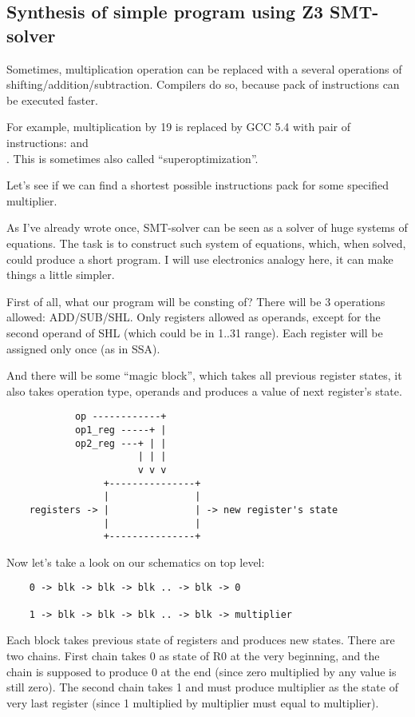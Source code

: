 \subsection{Synthesis of simple program using Z3 SMT-solver}

Sometimes, multiplication operation can be replaced with a several operations of shifting/addition/subtraction.
Compilers do so, because pack of instructions can be executed faster.

For example, multiplication by 19 is replaced by GCC 5.4 with pair of instructions:  and\\
.
This is sometimes also called ``superoptimization''.

Let's see if we can find a shortest possible instructions pack for some specified multiplier.

As I've already wrote once, SMT-solver can be seen as a solver of huge systems of equations.
The task is to construct such system of equations, which, when solved, could produce a short program.
I will use electronics analogy here, it can make things a little simpler.

First of all, what our program will be consting of? There will be 3 operations allowed: ADD/SUB/SHL.
Only registers allowed as operands, except for the second operand of SHL (which could be in 1..31 range).
Each register will be assigned only once (as in \ac{SSA}).

And there will be some ``magic block'', which takes all previous register states, it also takes operation type,
operands and produces a value of next register's state.

\begin{lstlisting}
	        op ------------+
	        op1_reg -----+ |
	        op2_reg ---+ | |
	                   | | |
	                   v v v
	             +---------------+
	             |               |
	registers -> |               | -> new register's state
	             |               |
	             +---------------+
\end{lstlisting}

Now let's take a look on our schematics on top level:

\begin{lstlisting}
	0 -> blk -> blk -> blk .. -> blk -> 0

	1 -> blk -> blk -> blk .. -> blk -> multiplier
\end{lstlisting}

Each block takes previous state of registers and produces new states.
There are two chains.
First chain takes 0 as state of R0 at the very beginning, and the chain is supposed to produce 0 at the end
(since zero multiplied by any value is still zero).
The second chain takes 1 and must produce multiplier as the state of very last register
(since 1 multiplied by multiplier must equal to multiplier).

